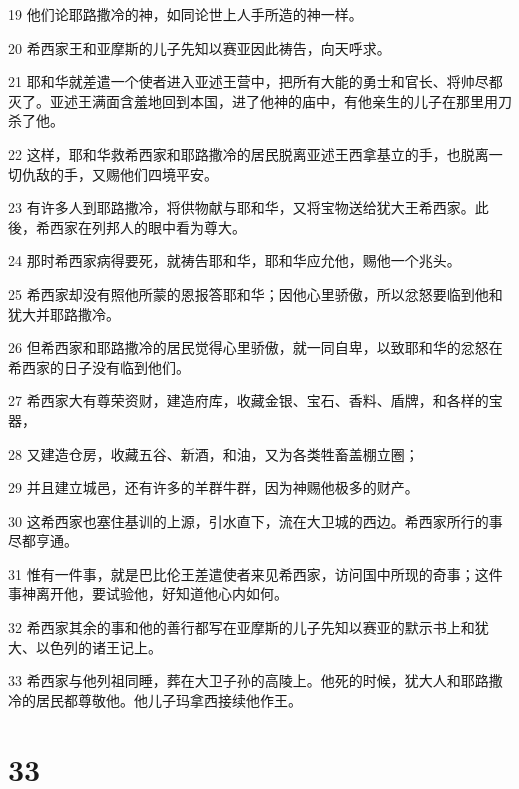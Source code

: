 \par 19 他们论耶路撒冷的神，如同论世上人手所造的神一样。
\par 20 希西家王和亚摩斯的儿子先知以赛亚因此祷告，向天呼求。
\par 21 耶和华就差遣一个使者进入亚述王营中，把所有大能的勇士和官长、将帅尽都灭了。亚述王满面含羞地回到本国，进了他神的庙中，有他亲生的儿子在那里用刀杀了他。
\par 22 这样，耶和华救希西家和耶路撒冷的居民脱离亚述王西拿基立的手，也脱离一切仇敌的手，又赐他们四境平安。
\par 23 有许多人到耶路撒冷，将供物献与耶和华，又将宝物送给犹大王希西家。此後，希西家在列邦人的眼中看为尊大。
\par 24 那时希西家病得要死，就祷告耶和华，耶和华应允他，赐他一个兆头。
\par 25 希西家却没有照他所蒙的恩报答耶和华；因他心里骄傲，所以忿怒要临到他和犹大并耶路撒冷。
\par 26 但希西家和耶路撒冷的居民觉得心里骄傲，就一同自卑，以致耶和华的忿怒在希西家的日子没有临到他们。
\par 27 希西家大有尊荣资财，建造府库，收藏金银、宝石、香料、盾牌，和各样的宝器，
\par 28 又建造仓房，收藏五谷、新酒，和油，又为各类牲畜盖棚立圈；
\par 29 并且建立城邑，还有许多的羊群牛群，因为神赐他极多的财产。
\par 30 这希西家也塞住基训的上源，引水直下，流在大卫城的西边。希西家所行的事尽都亨通。
\par 31 惟有一件事，就是巴比伦王差遣使者来见希西家，访问国中所现的奇事；这件事神离开他，要试验他，好知道他心内如何。
\par 32 希西家其余的事和他的善行都写在亚摩斯的儿子先知以赛亚的默示书上和犹大、以色列的诸王记上。
\par 33 希西家与他列祖同睡，葬在大卫子孙的高陵上。他死的时候，犹大人和耶路撒冷的居民都尊敬他。他儿子玛拿西接续他作王。

\chapter{33}

